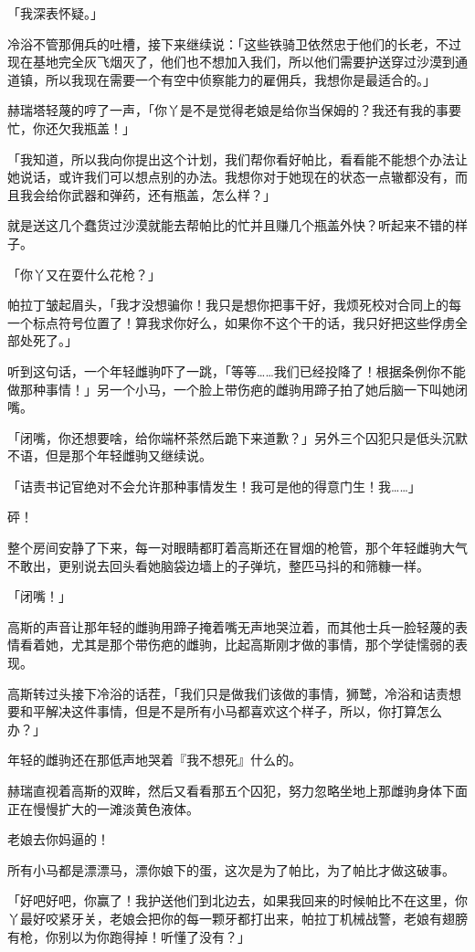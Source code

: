 「我深表怀疑。」

冷浴不管那佣兵的吐槽，接下来继续说：「这些铁骑卫依然忠于他们的长老，不过现在基地完全灰飞烟灭了，他们也不想加入我们，所以他们需要护送穿过沙漠到通道镇，所以我现在需要一个有空中侦察能力的雇佣兵，我想你是最适合的。」

赫瑞塔轻蔑的哼了一声，「你丫是不是觉得老娘是给你当保姆的？我还有我的事要忙，你还欠我瓶盖！」

「我知道，所以我向你提出这个计划，我们帮你看好帕比，看看能不能想个办法让她说话，或许我们可以想点别的办法。我想你对于她现在的状态一点辙都没有，而且我会给你武器和弹药，还有瓶盖，怎么样？」

就是送这几个蠢货过沙漠就能去帮帕比的忙并且赚几个瓶盖外快？听起来不错的样子。

「你丫又在耍什么花枪？」

帕拉丁皱起眉头，「我才没想骗你！我只是想你把事干好，我烦死校对合同上的每一个标点符号位置了！算我求你好么，如果你不这个干的话，我只好把这些俘虏全部处死了。」

听到这句话，一个年轻雌驹吓了一跳，「等等……我们已经投降了！根据条例你不能做那种事情！」另一个小马，一个脸上带伤疤的雌驹用蹄子拍了她后脑一下叫她闭嘴。

「闭嘴，你还想要啥，给你端杯茶然后跪下来道歉？」另外三个囚犯只是低头沉默不语，但是那个年轻雌驹又继续说。

「诘责书记官绝对不会允许那种事情发生！我可是他的得意门生！我……」

砰！

整个房间安静了下来，每一对眼睛都盯着高斯还在冒烟的枪管，那个年轻雌驹大气不敢出，更别说去回头看她脑袋边墙上的子弹坑，整匹马抖的和筛糠一样。

「闭嘴！」

高斯的声音让那年轻的雌驹用蹄子掩着嘴无声地哭泣着，而其他士兵一脸轻蔑的表情看着她，尤其是那个带伤疤的雌驹，比起高斯刚才做的事情，那个学徒懦弱的表现。

高斯转过头接下冷浴的话茬，「我们只是做我们该做的事情，狮鹫，冷浴和诘责想要和平解决这件事情，但是不是所有小马都喜欢这个样子，所以，你打算怎么办？」

年轻的雌驹还在那低声地哭着『我不想死』什么的。

赫瑞直视着高斯的双眸，然后又看看那五个囚犯，努力忽略坐地上那雌驹身体下面正在慢慢扩大的一滩淡黄色液体。

老娘去你妈逼的！

所有小马都是漂漂马，漂你娘下的蛋，这次是为了帕比，为了帕比才做这破事。

「好吧好吧，你赢了！我护送他们到北边去，如果我回来的时候帕比不在这里，你丫最好咬紧牙关，老娘会把你的每一颗牙都打出来，帕拉丁机械战警，老娘有翅膀有枪，你别以为你跑得掉！听懂了没有？」

